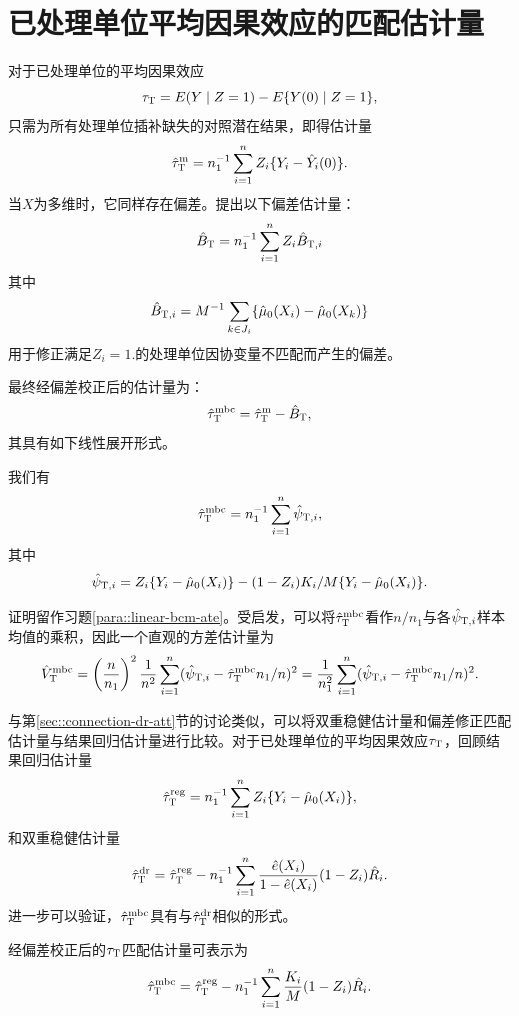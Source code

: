  
 
 \section{已处理单位平均因果效应的匹配估计量}

 
对于已处理单位的平均因果效应$$
\tau_\textsc{T} = E(Y\mid Z=1) - E\{  Y(0)  \mid Z=1\},
$$只需为所有处理单位插补缺失的对照潜在结果，即得估计量$$
\hat{\tau}_\textsc{T}^\textup{m} = n_1^{-1} \sum_{i=1}^n Z_i \{  Y_i - \hat{Y}_i(0) \}.
$$当$X$为多维时，它同样存在偏差。\citet{otsu2017bootstrap}提出以下偏差估计量：$$  
\hat{B}_\textsc{T} = n_1^{-1} \sum_{i=1}^n Z_i  \hat{B}_{\textsc{T},i} 
$$其中$$
\hat{B}_{\textsc{T},i} = M^{-1} \sum_{k \in J_i} \{  \hat{\mu}_0(X_i) -  \hat{\mu}_0(X_k)     \}
$$用于修正满足$Z_i = 1.$的处理单位因协变量不匹配而产生的偏差。


最终经偏差校正后的估计量为：
$$
\hat{\tau}_\textsc{T}^\textup{mbc} = \hat{\tau}_\textsc{T}^\textup{m} - \hat{B}_\textsc{T},
$$ 
其具有如下线性展开形式。

\begin{proposition}\label{prop::linear-expansion-att}
我们有 
\begin{eqnarray}\label{eq::linearATT}
\hat{\tau}_\textsc{T}^\textup{mbc}  =   n_1^{-1} \sum_{i=1}^n \hat{\psi}_{\textsc{T}, i},
\end{eqnarray}
其中 
$$
\hat{\psi}_{\textsc{T}, i} =   Z_i \{ Y_i - \hat{\mu}_0(X_i) \}
- (1-Z_i) K_i/M \{ Y_i - \hat{\mu}_0(X_i) \} . 
$$
\end{proposition}

证明留作习题\ref{para::linear-bcm-ate}。受\citet{otsu2017bootstrap}启发，可以将$\hat{\tau}_\textsc{T}^\textup{mbc}  $看作$n/n_1$与各$\hat{\psi}_{\textsc{T}, i}$样本均值的乘积，因此一个直观的方差估计量为$$
\hat{V}_\textsc{T}^\textup{mbc} =  \left( \frac{n}{n_1} \right)^2 \frac{1}{n^2} \sum_{i=1}^n (\hat{\psi}_{\textsc{T}, i} - \hat{\tau}_\textsc{T}^\textup{mbc} n_1/n)^2 = \frac{1}{n_1^2} \sum_{i=1}^n (\hat{\psi}_{\textsc{T}, i} - \hat{\tau}_\textsc{T}^\textup{mbc} n_1/n )^2.
$$

 
 与第\ref{sec::connection-dr-att}节的讨论类似，可以将双重稳健估计量和偏差修正匹配估计量与结果回归估计量进行比较。对于已处理单位的平均因果效应$\tau_\textsc{T}$，回顾结果回归估计量$$
\hat{\tau}^{\textup{reg}}_\textsc{T} = n_1^{-1} \sum_{i=1}^n Z_i \{ Y_i - \hat{\mu}_0(X_i) \} ,
$$和双重稳健估计量$$
\hat{\tau}_\textsc{T}^\textup{dr} =  \hat{\tau}^{\textup{reg}}_\textsc{T} 
- n_1^{-1} \sum_{i=1}^n \frac{  \hat{e}(X_i) }{ 1- \hat{e}(X_i) }  (1-Z_i)  \hat{R}_i .
$$进一步可以验证，$\hat{\tau}_\textsc{T}^\textup{mbc} $具有与$\hat{\tau}_\textsc{T}^\textup{dr} $相似的形式。 
\begin{proposition}
\label{prop::mbc-dr-att}
经偏差校正后的$\tau_\textsc{T}$匹配估计量可表示为
$$
\hat{\tau}_\textsc{T}^\textup{mbc}   = \hat{\tau}^{\textup{reg}}_\textsc{T} 
 - n_1^{-1} \sum_{i=1}^n { K_i\over M}  (1-Z_i)  \hat{R}_i.
$$
\end{proposition}


